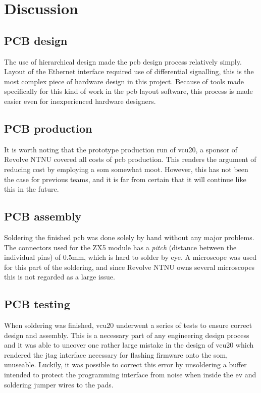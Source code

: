 \section{Discussion}

\subsection{PCB design}

The use of hierarchical design made the \acrshort{pcb} design process relatively simply. Layout of the Ethernet interface required use of differential signalling, this is the most complex piece of hardware design in this project. Because of tools made specifically for this kind of work in the \acrshort{pcb} layout software, this process is made easier even for inexperienced hardware designers.  

\subsection{PCB production}

It is worth noting that the prototype production run of \acrshort{vcu20}, a sponsor of Revolve NTNU covered all costs of \acrshort{pcb} production. This renders the argument of reducing cost by employing a \acrshort{som} somewhat moot. However, this has not been the case for previous teams, and it is far from certain that it will continue like this in the future.

\subsection{PCB assembly}

Soldering the finished \acrshort{pcb} was done solely by hand without any major problems. The connectors used for the ZX5 module has a \emph{pitch} (distance between the individual pins) of $0.5\si{\milli\metre}$, which is hard to solder by eye. A microscope was used for this part of the soldering, and since Revolve NTNU owns several microscopes this is not regarded as a large issue.   

\subsection{PCB testing}

When soldering was finished, \acrshort{vcu20} underwent a series of tests to ensure correct design and assembly. This is a necessary part of any engineering design process and it was able to uncover one rather large mistake in the design of \acrshort{vcu20} which rendered the \acrfull{jtag} interface necessary for flashing firmware onto the \acrshort{som}, unuseable. Luckily, it was possible to correct this error by unsoldering a buffer intended to protect the programming interface from noise when inside the \acrshort{ev} and soldering jumper wires to the pads.

